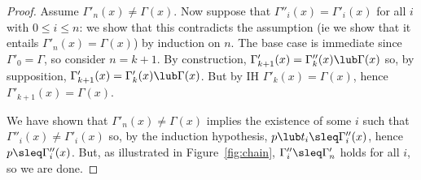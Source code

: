 \documentclass{sigplanconf}
\begin{document}
\begin{proof}
Assume $\Gamma'_n(x) \neq \Gamma(x)$. Now suppose
that $\Gamma''_i(x) = \Gamma'_i(x)$ for all $i$ with $0 \leq i \leq n$:
we show that this contradicts the assumption (ie we show that
it entails $\Gamma'_n(x) = \Gamma(x)$) by induction on $n$. The base case
is immediate since $\Gamma'_0 = \Gamma$, so consider $n = k+1$.
By construction, $\Gamma'_{k+1}(x) = \Gamma''_k(x) \lub \Gamma(x)$
so, by supposition, $\Gamma'_{k+1}(x) = \Gamma'_k(x) \lub \Gamma(x)$.
But by IH $\Gamma'_k(x) = \Gamma(x)$, hence $\Gamma'_{k+1}(x) = \Gamma(x)$.

We have shown that $\Gamma'_n(x) \neq \Gamma(x)$ implies the existence
of some $i$ such that $\Gamma''_i(x) \neq \Gamma'_i(x)$ so, by the induction hypothesis,
$p \lub t_i \sleq \Gamma''_i(x)$, hence $p \sleq \Gamma''_i(x)$.
But, as illustrated in Figure~\ref{fig:chain}, $\Gamma''_i \sleq \Gamma'_n$ holds
for all $i$, so we
are done.
\end{proof}
\end{document}
